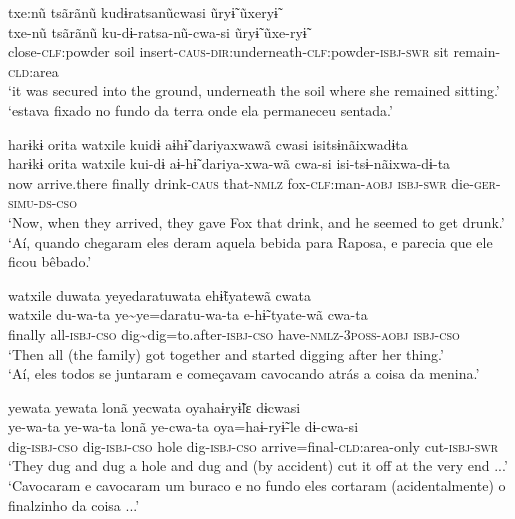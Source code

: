 \documentclass[output=paper,
modfonts,nonflat
]{langsci/langscibook}
\begin{document}
\newpage 
\ea txe:nũ tsãrãnũ kudɨratsanũcwasi ũryɨ̃ ũxeryɨ̃\\[.3em]
\gll txe-nũ				tsãrãnũ	ku-dɨ-ratsa-nũ-cwa-si								ũryɨ̃	ũxe-ryɨ̃\\
close-\textsc{clf}:powder	soil		insert-\textsc{caus-dir}:underneath-\textsc{clf}:powder-\textsc{isbj-swr}	sit		remain-\textsc{cld}:area\\
\glt ‘it was secured into the ground, underneath the soil where she remained sitting.’\\
‘estava fixado no fundo da terra onde ela permaneceu sentada.'
\z

\ea harɨkɨ orita watxile kuidɨ aɨhɨ̃ dariyaxwawã cwasi isitsɨnãixwadɨta\\[.3em]
\gll harɨkɨ		orita		watxile	kui-dɨ			aɨ-hɨ̃		dariya-xwa-wã	cwa-si	isi-tsɨ-nãixwa-dɨ-ta\\
now		arrive.there	finally		drink-\textsc{caus}	that-\textsc{nmlz}	fox-\textsc{clf}:man-\textsc{aobj}	\textsc{isbj-swr}	die-\textsc{ger-simu-ds-cso}\\
\glt ‘Now, when they arrived, they gave Fox that drink, and he seemed to get drunk.’\\
‘Aí, quando chegaram eles deram aquela bebida para Raposa, e  parecia que ele ficou bêbado.'
\z

\ea watxile duwata yeyedaratuwata ehɨ̃tyatewã cwata\\[.3em]
\gll watxile	du-wa-ta	ye\textasciitilde ye=daratu-wa-ta		e-hɨ̃-tyate-wã			cwa-ta\\
finally		all-\textsc{isbj-cso}	dig\textasciitilde dig=to.after-\textsc{isbj-cso}	have-\textsc{nmlz-3poss-aobj}	\textsc{isbj-cso}\\
\glt ‘Then all (the family) got together and started digging after her thing.’\\
‘Aí, eles todos se juntaram e começavam cavocando atrás a coisa da menina.'
\z
 
 
\ea yewata yewata lonã yecwata oyahaɨryɨ̃lɛ dɨcwasi\\[.3em]
\gll ye-wa-ta		ye-wa-ta	lonã	ye-cwa-ta		oya=haɨ-ryɨ̃-le				dɨ-cwa-si\\
dig-\textsc{isbj-cso}		dig-\textsc{isbj-cso}	hole	dig-\textsc{isbj-cso}		arrive=final-\textsc{cld}:area-only	cut-\textsc{isbj-swr}\\
\glt ‘They dug and dug a hole and dug and (by accident) cut it off at the very end ...’{\footnotemark}\\
\newpage 
‘Cavocaram e cavocaram um buraco e no fundo eles cortaram (acidentalmente) o finalzinho da coisa ...'
\z
\end{document}
